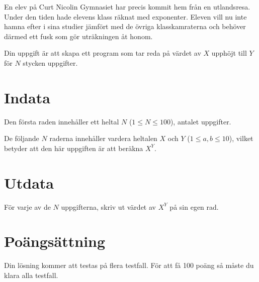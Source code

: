 En elev på Curt Nicolin Gymnasiet har precis kommit hem från en utlandsresa. Under
den tiden hade elevens klass räknat med exponenter. Eleven vill nu inte hamna efter
i sina studier jämfört med de övriga klasskamraterna och behöver därmed ett fusk som gör uträkningen åt honom.

Din uppgift är att skapa ett program som tar reda på värdet av $X$ upphöjt till $Y$ för $N$ stycken uppgifter.

\section*{Indata}
Den första raden innehåller ett heltal $N$ ($1 \leq N \leq 100$), antalet uppgifter.

De följande $N$ raderna innehåller vardera heltalen $X$ och $Y$ ($1 \leq a,b \leq 10$), 
vilket betyder att den här uppgiften är att beräkna $X^Y$.

\section*{Utdata}
För varje av de $N$ uppgifterna, skriv ut värdet av $X^Y$ på sin egen rad.

\section*{Poängsättning}
Din lösning kommer att testas på flera testfall. För att få 100 poäng så måste du klara alla testfall.

